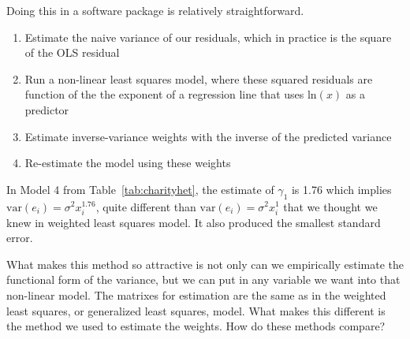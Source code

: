 Doing this in a software package is relatively straightforward.
\begin{enumerate}
\item Estimate the naive variance of our residuals, which in practice is the square of the OLS residual
\item Run a non-linear least squares model, where these squared residuals are function of the the exponent of a regression line that uses $\mbox{ln}\left(x\right)$ as a predictor
\item Estimate inverse-variance weights with the inverse of the predicted variance
\item Re-estimate the model using these weights
\end{enumerate}

In Model 4 from Table~\ref{tab:charityhet}, the estimate of $\gamma_1$ is 1.76 which implies $\mbox{var}\left(e_i\right)=\sigma^2x_i^{1.76}$, quite different than $\mbox{var}\left(e_i\right)=\sigma^2x_i^{1}$ that we thought we knew in weighted least squares model. It also produced the smallest standard error.

What makes this method so attractive is not only can we empirically estimate the functional form of the variance, but we can put in any variable we want into that non-linear model. The matrixes for estimation are the same as in the weighted least squares, or generalized least squares, model. What makes this different is the method we used to estimate the weights.
How do these methods compare?

